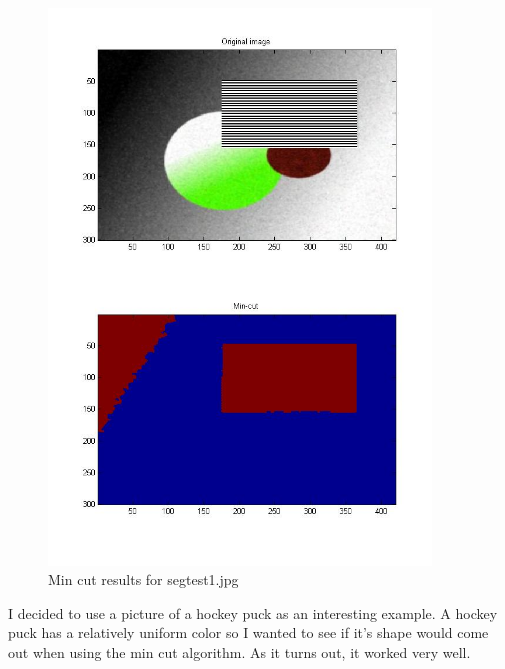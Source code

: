 \documentclass[11pt,psfig]{article}
\begin{document}
\begin{figure}[H]
\centering
\includegraphics[width=4in]{prob5plotA_2.jpg}
\caption{Min cut results for segtest1.jpg}
\end{figure}

I decided to use a picture of a hockey puck as an interesting example. A hockey puck has a relatively uniform color so I wanted to see if it's shape would come out when using the min cut algorithm. As it turns out, it worked very well. 
\end{document}
